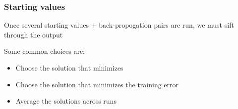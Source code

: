 \documentclass[12pt]{beamer}
\begin{document}
\begin{frame}[fragile]
\frametitle{Starting values}
Once several starting values $+$ back-propogation pairs are run, we must sift through the output

\vsp
Some common choices are:
\begin{itemize}
\item Choose the solution that minimizes 
\item Choose the solution that minimizes the  training error
\item Average the solutions across runs

\end{itemize}
\end{frame}
\end{document}
